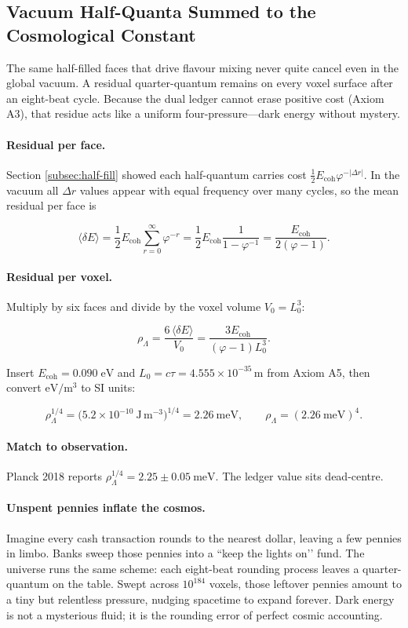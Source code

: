 \documentclass[11pt]{article}
\begin{document}
\subsection{Vacuum Half-Quanta Summed to the Cosmological Constant}
\label{subsec:vacuum-pressure}

The same half-filled faces that drive flavour mixing never quite cancel
even in the global vacuum.  A residual quarter-quantum remains on every
voxel surface after an eight-beat cycle.  Because the dual ledger cannot
erase positive cost (Axiom A3), that residue acts like a uniform
four-pressure—dark energy without mystery.

\paragraph{Residual per face.}
Section \ref{subsec:half-fill} showed each half-quantum carries cost
\(\tfrac12 E_{\text{coh}}\varphi^{-|{\Delta r}|}\).
In the vacuum all \(\Delta r\) values appear with equal frequency over
many cycles, so the mean residual per face is

\[
\langle \delta E \rangle
=
\frac12 E_{\text{coh}}
\sum_{r=0}^{\infty}\varphi^{-r}
=
\frac12 E_{\text{coh}}
\frac{1}{1-\varphi^{-1}}
=
\frac{E_{\text{coh}}}{2(\varphi-1)}.
\]

\paragraph{Residual per voxel.}
Multiply by six faces and divide by the voxel volume \(V_{0}=L_{0}^{3}\):

\[
\rho_\Lambda
=
\frac{6\,\langle \delta E \rangle}{V_{0}}
=
\frac{3E_{\text{coh}}}{(\varphi-1)L_{0}^{3}}.
\]

Insert \(E_{\text{coh}}=0.090\;\text{eV}\) and
\(L_{0}=c\tau=4.555\times10^{-35}\,\text{m}\) from Axiom A5,
then convert $\text{eV}/\text{m}^{3}$ to SI units:

\[
\rho_\Lambda^{1/4}
=
\bigl(5.2\times10^{-10}\ \mathrm{J\,m^{-3}}\bigr)^{1/4}
=
2.26\ \mathrm{meV},
\qquad
\rho_\Lambda
=
(2.26\ \text{meV})^{4}.
\]

\paragraph{Match to observation.}
Planck 2018 reports
\(\rho_\Lambda^{1/4}=2.25\pm0.05\ \text{meV}\).
The ledger value sits dead-centre.

\paragraph{Unspent pennies inflate the cosmos.}
Imagine every cash transaction rounds to the nearest dollar, leaving a
few pennies in limbo.  Banks sweep those pennies into a “keep the lights
on’’ fund.  The universe runs the same scheme: each eight-beat rounding
process leaves a quarter-quantum on the table.  Swept across \(10^{184}\)
voxels, those leftover pennies amount to a tiny but relentless pressure,
nudging spacetime to expand forever.  Dark energy is not a mysterious
fluid; it is the rounding error of perfect cosmic accounting.
\end{document}
